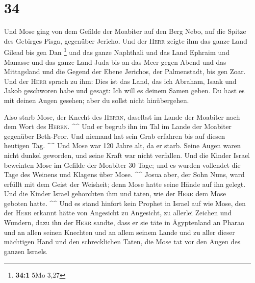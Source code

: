 \hypertarget{section-11}{%
\section{34}\label{section-11}}

 Und Mose ging von dem Gefilde der Moabiter auf den Berg
Nebo, auf die Spitze des Gebirges Pisga, gegenüber Jericho. Und der
\textsc{Herr} zeigte ihm das ganze Land Gilead bis gen Dan \footnote{\textbf{34:1}
  5Mo 3,27}  und das ganze Naphthali und das Land Ephraim
und Manasse und das ganze Land Juda bis an das Meer gegen Abend
 und das Mittagsland und die Gegend der Ebene Jerichos,
der Palmenstadt, bis gen Zoar.  Und der \textsc{Herr}
sprach zu ihm: Dies ist das Land, das ich Abraham, Isaak und Jakob
geschworen habe und gesagt: Ich will es deinem Samen geben. Du hast es
mit deinen Augen gesehen; aber du sollst nicht hinübergehen.

 Also starb Mose, der Knecht des \textsc{Herrn}, daselbst
im Lande der Moabiter nach dem Wort des \textsc{Herrn}. \^{}\^{}
 Und er begrub ihn im Tal im Lande der Moabiter gegenüber
Beth-Peor. Und niemand hat sein Grab erfahren bis auf diesen heutigen
Tag. \^{}\^{}  Und Mose war 120 Jahre alt, da er starb.
Seine Augen waren nicht dunkel geworden, und seine Kraft war nicht
verfallen.  Und die Kinder Israel beweinten Mose im
Gefilde der Moabiter 30 Tage; und es wurden vollendet die Tage des
Weinens und Klagens über Mose. \^{}\^{}  Josua aber, der
Sohn Nuns, ward erfüllt mit dem Geist der Weisheit; denn Mose hatte
seine Hände auf ihn gelegt. Und die Kinder Israel gehorchten ihm und
taten, wie der \textsc{Herr} dem Mose geboten hatte. \^{}\^{}
 Und es stand hinfort kein Prophet in Israel auf wie
Mose, den der \textsc{Herr} erkannt hätte von Angesicht zu Angesicht,
 zu allerlei Zeichen und Wundern, dazu ihn der
\textsc{Herr} sandte, dass er sie täte in Ägyptenland an Pharao und an
allen seinen Knechten und an allem seinem Lande  und zu
aller dieser mächtigen Hand und den schrecklichen Taten, die Mose tat
vor den Augen des ganzen Israels.
